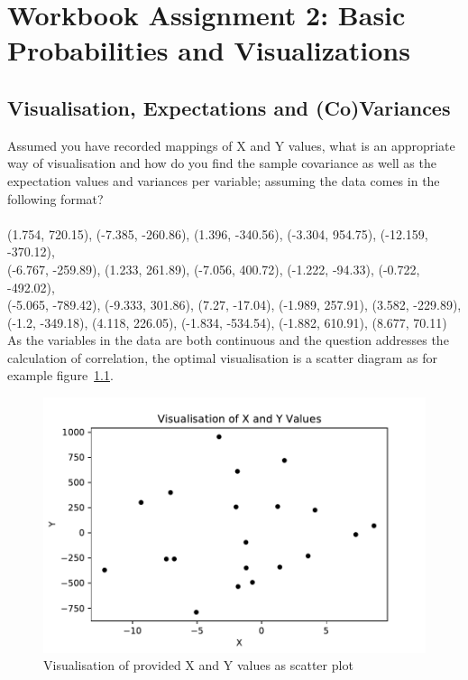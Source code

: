\chapter{Workbook Assignment 2: Basic Probabilities and Visualizations }	

\section{Visualisation, Expectations and (Co)Variances}
Assumed you have recorded mappings of X and Y values, what is an appropriate way of visualisation and how do you find the sample covariance as well as the expectation values and variances per variable; assuming the data comes in the following format?\\
\\
(1.754, 720.15), (-7.385, -260.86), (1.396, -340.56), (-3.304, 954.75), 
(-12.159, -370.12),\\ (-6.767, -259.89), (1.233, 261.89), (-7.056, 400.72), 
(-1.222, -94.33), (-0.722, -492.02),\\ (-5.065, -789.42), (-9.333, 301.86), 
(7.27, -17.04), (-1.989, 257.91), (3.582, -229.89), \\(-1.2, -349.18), 
(4.118, 226.05), (-1.834, -534.54), (-1.882, 610.91), (8.677, 70.11) \\

As the variables in the data are both continuous and the question addresses the calculation of correlation, the optimal visualisation is a scatter diagram as for example figure~\ref{fig:WorkbookAssignment2a}.

\begin{figure}[h]
\centering
\includegraphics[width=16cm]{pics/WorkbookAssignment2a.pdf}
\caption{Visualisation of provided X and Y values as scatter plot}
\label{fig:WorkbookAssignment2a}
\end{figure}
\FloatBarrier


